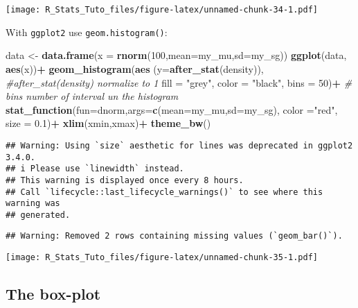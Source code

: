 \documentclass[
]{article}
\newenvironment{Shaded}{\begin{snugshade}}{\end{snugshade}}
\newcommand{\AttributeTok}[1]{\textcolor[rgb]{0.13,0.29,0.53}{#1}}
\newcommand{\CommentTok}[1]{\textcolor[rgb]{0.56,0.35,0.01}{\textit{#1}}}
\newcommand{\DecValTok}[1]{\textcolor[rgb]{0.00,0.00,0.81}{#1}}
\newcommand{\FloatTok}[1]{\textcolor[rgb]{0.00,0.00,0.81}{#1}}
\newcommand{\FunctionTok}[1]{\textcolor[rgb]{0.13,0.29,0.53}{\textbf{#1}}}
\newcommand{\NormalTok}[1]{#1}
\newcommand{\OtherTok}[1]{\textcolor[rgb]{0.56,0.35,0.01}{#1}}
\newcommand{\SpecialCharTok}[1]{\textcolor[rgb]{0.81,0.36,0.00}{\textbf{#1}}}
\newcommand{\StringTok}[1]{\textcolor[rgb]{0.31,0.60,0.02}{#1}}
\begin{document}
\texttt{[image: R\_Stats\_Tuto\_files/figure-latex/unnamed-chunk-34-1.pdf]}

With \texttt{ggplot2} use \texttt{geom.histogram()}:

\begin{Shaded}
\begin{Highlighting}[]
\NormalTok{data }\OtherTok{\textless{}{-}} \FunctionTok{data.frame}\NormalTok{(}\AttributeTok{x =} \FunctionTok{rnorm}\NormalTok{(}\DecValTok{100}\NormalTok{,}\AttributeTok{mean=}\NormalTok{my\_mu,}\AttributeTok{sd=}\NormalTok{my\_sg))}
\FunctionTok{ggplot}\NormalTok{(data, }\FunctionTok{aes}\NormalTok{(x))}\SpecialCharTok{+}
  \FunctionTok{geom\_histogram}\NormalTok{(}\FunctionTok{aes}\NormalTok{ (}\AttributeTok{y=}\FunctionTok{after\_stat}\NormalTok{(density)), }\CommentTok{\#after\_stat(density) normalize to 1}
                 \AttributeTok{fill =} \StringTok{"grey"}\NormalTok{,}
                 \AttributeTok{color =} \StringTok{"black"}\NormalTok{,}
                 \AttributeTok{bins =} \DecValTok{50}\NormalTok{)}\SpecialCharTok{+} \CommentTok{\# bins number of interval un the histogram}
  \FunctionTok{stat\_function}\NormalTok{(}\AttributeTok{fun=}\NormalTok{dnorm,}\AttributeTok{args=}\FunctionTok{c}\NormalTok{(}\AttributeTok{mean=}\NormalTok{my\_mu,}\AttributeTok{sd=}\NormalTok{my\_sg),}
                \AttributeTok{color =}\StringTok{"red"}\NormalTok{, }
                \AttributeTok{size =} \FloatTok{0.1}\NormalTok{)}\SpecialCharTok{+}
  \FunctionTok{xlim}\NormalTok{(xmin,xmax)}\SpecialCharTok{+}
  \FunctionTok{theme\_bw}\NormalTok{()}
\end{Highlighting}
\end{Shaded}

\begin{verbatim}
## Warning: Using `size` aesthetic for lines was deprecated in ggplot2 3.4.0.
## i Please use `linewidth` instead.
## This warning is displayed once every 8 hours.
## Call `lifecycle::last_lifecycle_warnings()` to see where this warning was
## generated.
\end{verbatim}

\begin{verbatim}
## Warning: Removed 2 rows containing missing values (`geom_bar()`).
\end{verbatim}

\texttt{[image: R\_Stats\_Tuto\_files/figure-latex/unnamed-chunk-35-1.pdf]}

\hypertarget{the-box-plot}{%
\subsection{The box-plot}\label{the-box-plot}}
\end{document}
